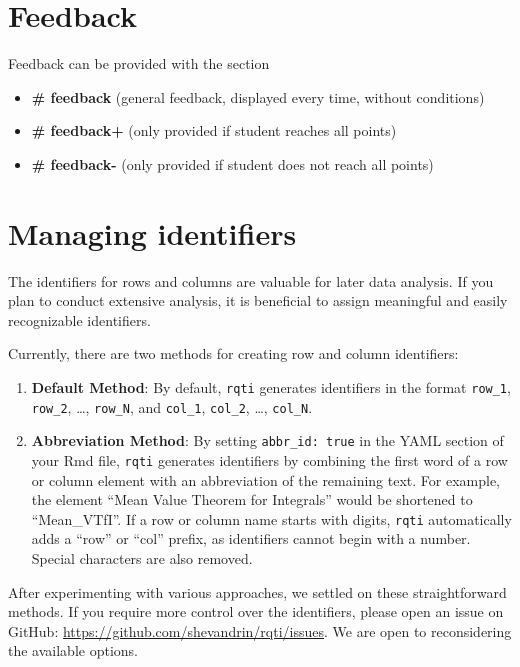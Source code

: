 \documentclass[twoside]{tufte-book}
\providecommand{\tightlist}{%
  \setlength{\itemsep}{0pt}\setlength{\parskip}{0pt}}
\begin{document}
\section{Feedback}\label{feedback-7}

Feedback can be provided with the section

\begin{itemize}
\tightlist
\item
  \textbf{\# feedback} (general feedback, displayed every time, without conditions)
\item
  \textbf{\# feedback+} (only provided if student reaches all points)
\item
  \textbf{\# feedback-} (only provided if student does not reach all points)
\end{itemize}

\section{Managing identifiers}\label{ids}

The identifiers for rows and columns are valuable for later data analysis. If you plan to conduct extensive analysis, it is beneficial to assign meaningful and easily recognizable identifiers.

Currently, there are two methods for creating row and column identifiers:

\begin{enumerate}
\def\labelenumi{\arabic{enumi}.}
\tightlist
\item
  \textbf{Default Method}: By default, \texttt{rqti} generates identifiers in the format \texttt{row\_1}, \texttt{row\_2}, \ldots, \texttt{row\_N}, and \texttt{col\_1}, \texttt{col\_2}, \ldots, \texttt{col\_N}.
\item
  \textbf{Abbreviation Method}: By setting \texttt{abbr\_id:\ true} in the YAML section of your Rmd file, \texttt{rqti} generates identifiers by combining the first word of a row or column element with an abbreviation of the remaining text. For example, the element ``Mean Value Theorem for Integrals'' would be shortened to ``Mean\_VTfI''. If a row or column name starts with digits, \texttt{rqti} automatically adds a ``row'' or ``col'' prefix, as identifiers cannot begin with a number. Special characters are also removed.
\end{enumerate}

After experimenting with various approaches, we settled on these straightforward methods. If you require more control over the identifiers, please open an issue on GitHub: \url{https://github.com/shevandrin/rqti/issues}. We are open to reconsidering the available options.
\end{document}
